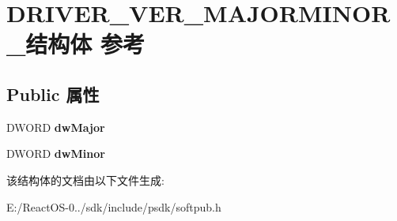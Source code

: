 \hypertarget{struct_d_r_i_v_e_r___v_e_r___m_a_j_o_r_m_i_n_o_r__}{}\section{D\+R\+I\+V\+E\+R\+\_\+\+V\+E\+R\+\_\+\+M\+A\+J\+O\+R\+M\+I\+N\+O\+R\+\_\+结构体 参考}
\label{struct_d_r_i_v_e_r___v_e_r___m_a_j_o_r_m_i_n_o_r__}
\subsection*{Public 属性}
\begin{DoxyCompactItemize}
\item 
\mbox{\label{struct_d_r_i_v_e_r___v_e_r___m_a_j_o_r_m_i_n_o_r___af15405d06e44fc24e0cfb90803d927e7}} 
D\+W\+O\+RD {\bfseries dw\+Major}
\item 
\mbox{\label{struct_d_r_i_v_e_r___v_e_r___m_a_j_o_r_m_i_n_o_r___abde000ec9872fe499f70c9910c15d822}} 
D\+W\+O\+RD {\bfseries dw\+Minor}
\end{DoxyCompactItemize}


该结构体的文档由以下文件生成\+:\begin{DoxyCompactItemize}
\item 
E\+:/\+React\+O\+S-\/0../sdk/include/psdk/softpub.\+h\end{DoxyCompactItemize}
